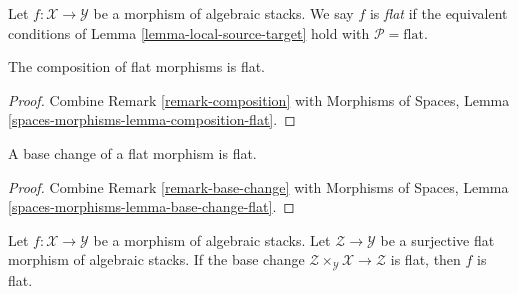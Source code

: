 \begin{definition}
\label{definition-flat}
Let $f : \mathcal{X} \to \mathcal{Y}$ be a morphism of algebraic stacks.
We say $f$ is {\it flat} if the equivalent conditions of
Lemma \ref{lemma-local-source-target}
hold with $\mathcal{P} = \text{flat}$.
\end{definition}

\begin{lemma}
\label{lemma-composition-flat}
The composition of flat morphisms is flat.
\end{lemma}

\begin{proof}
Combine
Remark \ref{remark-composition}
with
Morphisms of Spaces, Lemma
\ref{spaces-morphisms-lemma-composition-flat}.
\end{proof}

\begin{lemma}
\label{lemma-base-change-flat}
A base change of a flat morphism is flat.
\end{lemma}

\begin{proof}
Combine
Remark \ref{remark-base-change}
with
Morphisms of Spaces, Lemma
\ref{spaces-morphisms-lemma-base-change-flat}.
\end{proof}

\begin{lemma}
\label{lemma-descent-flat}
Let $f : \mathcal{X} \to \mathcal{Y}$ be a morphism of algebraic stacks.
Let $\mathcal{Z} \to \mathcal{Y}$ be a surjective flat morphism of algebraic
stacks. If the base change
$\mathcal{Z} \times_\mathcal{Y} \mathcal{X} \to \mathcal{Z}$
is flat, then $f$ is flat.
\end{lemma}

